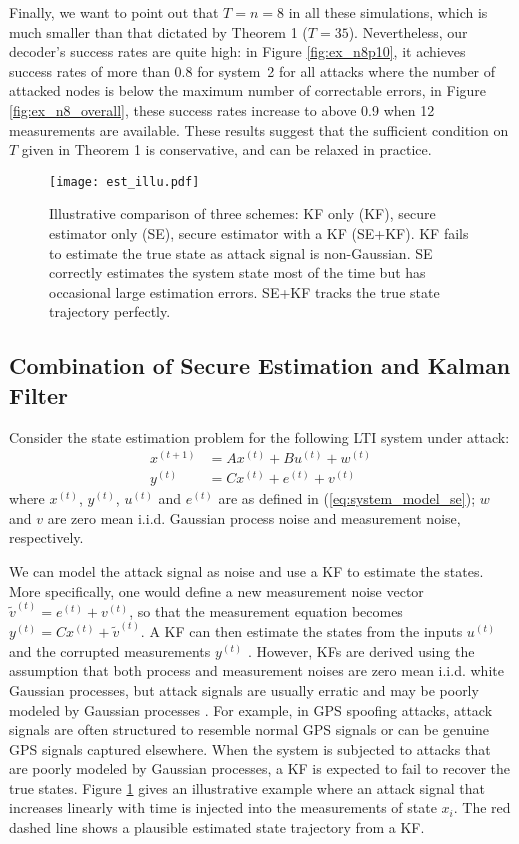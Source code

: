 \documentclass[journal]{IEEEtran}
\begin{document}
Finally, we want to point out that $T=n=8$ in all these simulations, which is much smaller than that dictated by Theorem 1 ($T=35$).
Nevertheless, our decoder's success rates are quite high: in Figure \ref{fig:ex_n8p10}, it achieves success rates of more than 0.8 for system~2 for all attacks where the number of attacked nodes is below the maximum number of correctable errors, in Figure \ref{fig:ex_n8_overall}, these success rates increase to above 0.9 when 12 measurements are available. These results suggest that the sufficient condition on $T$ given in Theorem 1 is conservative, and can be relaxed in practice.

\begin{figure}
\center
\texttt{[image: est\_illu.pdf]}
\caption{Illustrative comparison of three schemes: KF only (KF), secure estimator only (SE), secure estimator with a KF (SE+KF). KF fails to estimate the true state as attack signal is non-Gaussian. SE correctly estimates the system state most of the time but has occasional large estimation errors. SE+KF tracks the true state trajectory perfectly.}
\label{fig:estimation}
\end{figure}




\subsection{Combination of Secure Estimation and Kalman Filter}\label{sec:estimation}
Consider the state estimation problem for the following LTI system under attack:
\begin{equation}
\begin{aligned}
x^{(t+1)} & = A x^{(t)} + B u^{(t)} + w^{(t)}\\
y^{(t)} & = C x^{(t)} + e^{(t)} + v^{(t)}
\end{aligned}
\end{equation}
where $x^{(t)}$, $y^{(t)}$, $u^{(t)}$ and $e^{(t)}$ are as defined in (\ref{eq:system_model_se});
$w$ and $v$ are zero mean i.i.d. Gaussian process noise and measurement noise, respectively. 

We can model the attack signal as noise and use a KF to estimate the states. More specifically, one would define a new measurement noise vector $\tilde{v}^{(t)} = e^{(t)} + v^{(t)}$, so that the measurement equation becomes $y^{(t)} = C x^{(t)} + \tilde{v}^{(t)}$. A KF can then estimate the states from the inputs $u^{(t)}$ and the corrupted measurements $y^{(t)}$ \cite{KwonACC}. However, KFs are derived using the assumption that both process and measurement noises are zero mean i.i.d. white Gaussian processes, but attack signals are usually erratic and may be poorly modeled by Gaussian processes \cite{KwonACC}. For example, in GPS spoofing attacks, attack signals are often structured to resemble normal GPS signals or can be genuine GPS signals captured elsewhere. When the system is subjected to attacks that are poorly modeled by Gaussian processes, a KF is expected to fail to recover the true states. Figure \ref{fig:estimation} gives an illustrative example where an attack signal that increases linearly with time is injected into the measurements of state $x_i$. The red dashed line shows a plausible estimated state trajectory from a KF.
\end{document}
